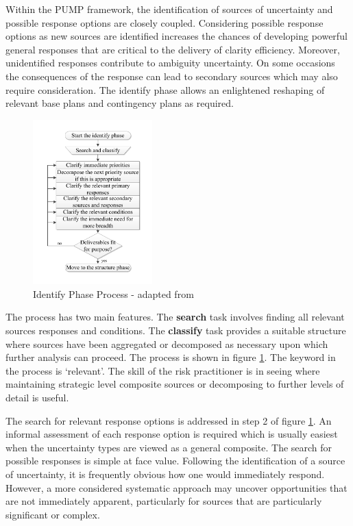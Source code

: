 Within the PUMP framework, the identification of sources of uncertainty and possible response options are closely coupled. 
Considering possible response options as new sources are identified increases the chances of developing powerful general responses that are critical to the delivery of clarity efficiency. 
Moreover, unidentified responses contribute to ambiguity uncertainty. 
On some occasions the consequences of the response can lead to secondary sources which may also require consideration.
The identify phase allows an enlightened reshaping of relevant base plans and contingency plans as required.

\begin{figure}[!h]
  \centering
    \includegraphics[width = 0.41\textwidth]{./Figures/Identify.pdf} 
\caption{Identify Phase Process - adapted from \cite{chapman}}
\label{Figure:Identify}
\end{figure}

The process has two main features. 
The \textbf{search} task involves finding all relevant sources responses and conditions. 
The \textbf{classify} task provides a suitable structure where sources have been aggregated or decomposed as necessary upon which further analysis can proceed.
The process is shown in figure \ref{Figure:Identify}.
The keyword in the process is `relevant'. 
The skill of the risk practitioner is in seeing where maintaining strategic level composite sources or decomposing to further levels of detail is useful.

The search for relevant response options is addressed in step 2 of figure \ref{Figure:Identify}.
An informal assessment of each response option is required which is usually easiest when the uncertainty types are viewed as a general composite.
The search for possible responses is simple at face value.
Following the identification of a source of uncertainty, it is frequently obvious how one would immediately respond.
However, a more considered systematic approach may uncover opportunities that are not immediately apparent, particularly for sources that are particularly significant or complex.

